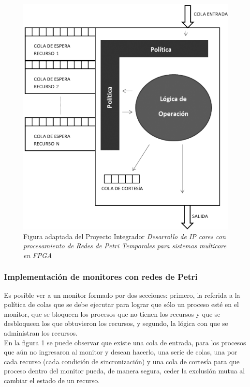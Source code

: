 \begin{figure}[H]
    \centering
    \includegraphics[scale=0.5]{images/monitor_mico.png}
    \caption[Monitor.]{Figura adaptada del Proyecto Integrador \textit{Desarrollo de IP cores con procesamiento de Redes de Petri Temporales para sistemas multicore en FPGA}}
    \label{fig:monitormico}
\end{figure}

\subsubsection{Implementación de monitores con redes de Petri}
Es posible ver a un monitor formado por dos secciones: primero, la referida a la política de colas que se debe ejecutar para lograr que sólo un proceso esté en el monitor, que se bloqueen los procesos que no tienen los recursos y que se desbloqueen los que obtuvieron los recursos, y segundo, la lógica con que se administran los recursos.\\
En la figura \ref{fig:monitormico} se puede observar que existe una cola de entrada, para los procesos que aún no ingresaron al monitor y desean hacerlo, una serie de colas, una por cada recurso (cada condición de sincronización) y una cola de cortesía para que  proceso dentro del monitor pueda, de manera segura, ceder la exclusión mutua al cambiar el estado de un recurso.\\

